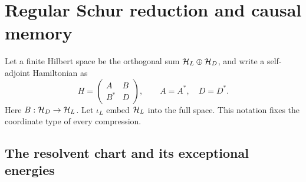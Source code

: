 

\section{Regular Schur reduction and causal memory}
\label{a-spectral-feshbach}

Let a finite Hilbert space be the orthogonal sum
$\mathcal H_L\oplus\mathcal H_D$, and write a self-adjoint Hamiltonian as
\begin{equation}
 H=\begin{pmatrix}A&B\\B^*&D\end{pmatrix},\qquad A=A^*,\quad D=D^*.
 \label{a-spectral-block-hamiltonian}
\end{equation}
Here $B:\mathcal H_D\to\mathcal H_L$. Let $\iota_L$ embed $\mathcal H_L$ into the full
space. This notation fixes the coordinate type of every compression.

\subsection{The resolvent chart and its exceptional energies}


